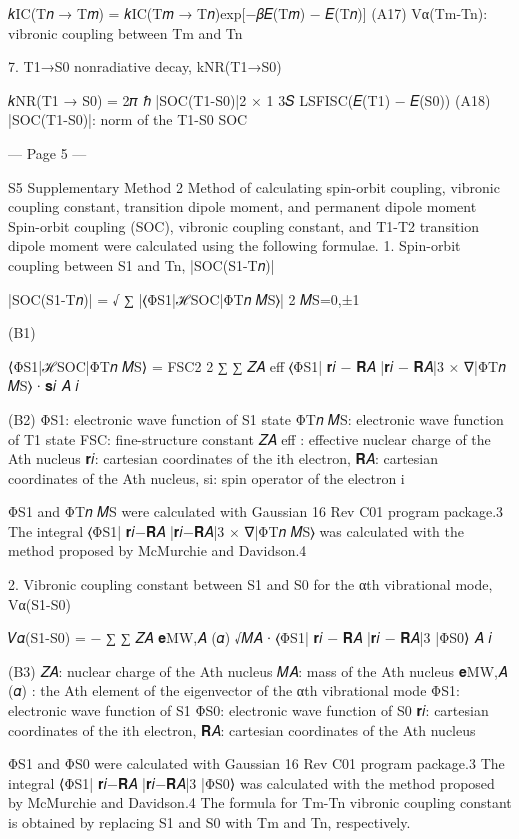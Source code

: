 𝑘IC(T𝑛 → T𝑚) = 𝑘IC(T𝑚 → T𝑛)exp[−𝛽{𝐸(T𝑚) − 𝐸(T𝑛)}] 
(A17) 
Vα(Tm-Tn): vibronic coupling between Tm and Tn 
 
7. T1→S0 nonradiative decay, kNR(T1→S0) 
 
𝑘NR(T1 → S0) = 2𝜋
ℏ |SOC(T1-S0)|2 × 1
3𝑆 LSFISC(𝐸(T1) − 𝐸(S0)) 
(A18) 
|SOC(T1-S0)|: norm of the T1-S0 SOC 
 
 


--- Page 5 ---
 
S5 
Supplementary Method 2 
Method of calculating spin-orbit coupling, vibronic coupling constant, transition dipole 
moment, and permanent dipole moment 
Spin-orbit coupling (SOC), vibronic coupling constant, and T1-T2 transition dipole moment 
were calculated using the following formulae. 
1. Spin-orbit coupling between S1 and Tn, |SOC(S1-T𝑛)| 
 
|SOC(S1-T𝑛)| = √
∑
|⟨ΦS1|ℋSOC|ΦT𝑛
𝑀S⟩|
2
𝑀S=0,±1
 
 
(B1) 
 
⟨ΦS1|ℋSOC|ΦT𝑛
𝑀S⟩ = FSC2
2
∑ ∑ 𝑍𝐴
eff ⟨ΦS1| 𝐫𝑖 − 𝐑𝐴
|𝐫𝑖 − 𝐑𝐴|3 × ∇|ΦT𝑛
𝑀S⟩ ∙ 𝐬𝑖
𝐴
𝑖
 
 
(B2) 
ΦS1: electronic wave function of S1 state 
ΦT𝑛
𝑀S: electronic wave function of T1 state 
FSC: fine-structure constant 
𝑍𝐴
eff : effective nuclear charge of the Ath nucleus 
𝐫𝑖: cartesian coordinates of the ith electron,  
𝐑𝐴: cartesian coordinates of the Ath nucleus, 
si: spin operator of the electron i 
 
ΦS1 and ΦT𝑛
𝑀S were calculated with Gaussian 16 Rev C01 program package.3 The integral 
⟨ΦS1|
𝐫𝑖−𝐑𝐴
|𝐫𝑖−𝐑𝐴|3 × ∇|ΦT𝑛
𝑀S⟩ was calculated with the method proposed by McMurchie and 
Davidson.4 
 
2. Vibronic coupling constant between S1 and S0 for the αth vibrational mode, Vα(S1-S0) 
 
𝑉𝛼(S1-S0) = − ∑ ∑ 𝑍𝐴
𝐞MW,𝐴
(𝛼)
√𝑀𝐴
∙ ⟨ΦS1| 𝐫𝑖 − 𝐑𝐴
|𝐫𝑖 − 𝐑𝐴|3 |ΦS0⟩
𝐴
𝑖
 
 
(B3) 
𝑍𝐴: nuclear charge of the Ath nucleus 
𝑀𝐴: mass of the Ath nucleus 
𝐞MW,𝐴
(𝛼)
: the Ath element of the eigenvector of the αth vibrational mode 
ΦS1: electronic wave function of S1 
ΦS0: electronic wave function of S0 
𝐫𝑖: cartesian coordinates of the ith electron,  
𝐑𝐴: cartesian coordinates of the Ath nucleus 
 
ΦS1 and ΦS0 were calculated with Gaussian 16 Rev C01 program package.3 The integral 
⟨ΦS1|
𝐫𝑖−𝐑𝐴
|𝐫𝑖−𝐑𝐴|3 |ΦS0⟩ was calculated with the method proposed by McMurchie and 
Davidson.4 The formula for Tm-Tn vibronic coupling constant is obtained by replacing S1 
and S0 with Tm and Tn, respectively.  
 
